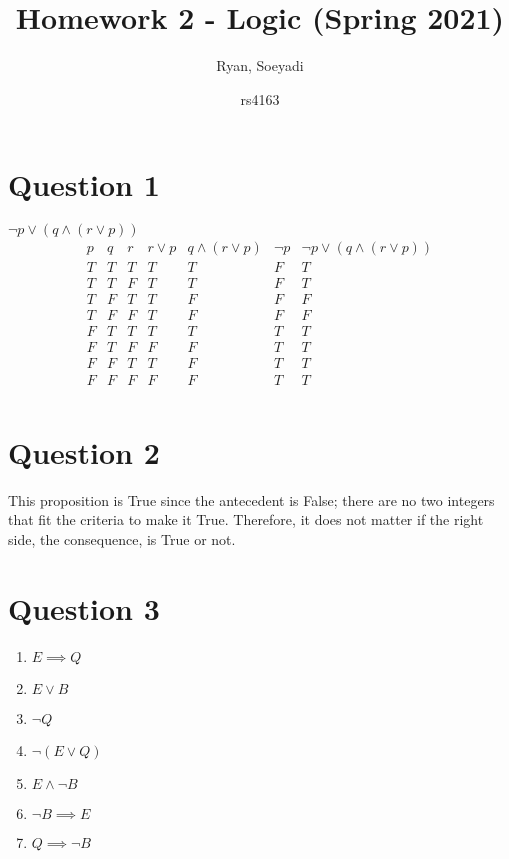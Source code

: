 \documentclass{article}
\title{Homework 2 - Logic (Spring 2021)}
\author
{
Ryan, Soeyadi
\and rs4163
}
\begin{document}
    \maketitle
    
    \section*{Question 1}
    $\neg p \lor (q \land (r \lor p))$
    \begin{displaymath}
    \begin{array}{|c|c|c|c|c|c|c|}
    
    p & q & r & r \lor p & q \land (r \lor p) & \neg p & \neg p \lor (q \land (r \lor p)) \\
    \hline
    T & T & T & T & T & F & T \\
    T & T & F & T & T & F & T \\
    T & F & T & T & F & F & F \\
    T & F & F & T & F & F & F \\
    F & T & T & T & T & T & T \\
    F & T & F & F & F & T & T \\
    F & F & T & T & F & T & T \\
    F & F & F & F & F & T & T \\
    \end{array}
    \end{displaymath}
    \newpage
    \section*{Question 2}
     This proposition is True since the antecedent is False; there are no two integers that fit the criteria to make it True. Therefore, it does not matter if the right side, the consequence, is True or not.
    \newpage
    \section*{Question 3}
    \begin{enumerate}
    \item $E \implies Q$ \\
    \item $E \lor B$ \\
    \item $\neg Q$ \\
    \item $\neg (E \lor Q)$ \\
    \item $E \land \neg B$ \\
    \item $\neg B \implies E$ \\
    \item $Q \implies \neg B$
    \end{enumerate}
    \newpage
\end{document}

